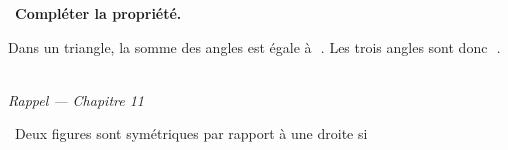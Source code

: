 \documentclass[a4paper,11pt]{article}
\newcommand{\bl}[1][4cm]{\,\makebox[#1]{\dotfill}\,}
\newcommand{\coeur}{\textcolor{Couleur8}{\faHeart}\ }
\newcommand{\coeurrappel}{\textcolor{Couleur6}{\faHeart}\ }
\begin{document}
\noindent \coeur \textbf{Compl\'eter la propri\'et\'e.}
\begin{mdframed}[linecolor=Couleur1,linewidth=4pt,topline=false,bottomline=false,rightline=false,backgroundcolor=Couleur1!5,innerleftmargin=8pt,innertopmargin=6pt,innerbottommargin=6pt]
Dans un triangle, la somme des angles est \'egale \`a \bl[2cm]. Les trois angles sont donc \bl[4cm].
\end{mdframed}

\vspace{0.3cm}
\noindent{\textcolor{Couleur8}{\rule{\textwidth}{0.5pt}}}\\
{\small\textit{\textcolor{Couleur8}{Rappel --- Chapitre 11}}}
\vspace{0.1cm}

\noindent \coeurrappel Deux figures sont sym\'etriques par rapport \`a une droite si \dotfill
\end{document}
